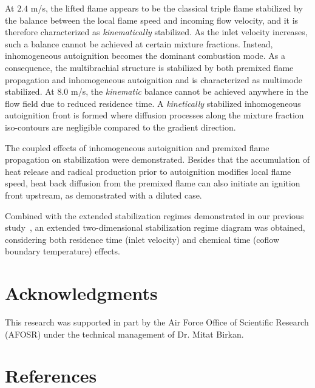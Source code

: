 \documentclass[review,3p,times]{elsarticle}
\begin{document}
At $2.4$ m/s, the lifted flame appears to be the classical triple flame stabilized by the balance between the local flame speed and incoming flow velocity, and it is therefore characterized as \emph {kinematically} stabilized.  As the inlet velocity increases, such a balance cannot be achieved at certain mixture fractions.  Instead, inhomogeneous autoignition becomes the dominant combustion mode.  As a consequence, the multibrachial structure is stabilized by both premixed flame propagation and inhomogeneous autoignition and is characterized as multimode stabilized.  At $8.0$ m/s, the \emph{kinematic} balance cannot be achieved anywhere in the flow field due to reduced residence time.  A \emph {kinetically} stabilized inhomogeneous autoignition front is formed where diffusion processes along the mixture fraction iso-contours are negligible compared to the gradient direction.

\textcolor{dl}{The coupled effects of inhomogeneous autoignition and premixed flame propagation on stabilization were demonstrated.  Besides that the accumulation of heat release and radical production prior to autoignition modifies local flame speed, heat back diffusion from the premixed flame can also initiate an ignition front upstream, as demonstrated with a diluted case.}

Combined with the extended stabilization regimes demonstrated in our previous study~\cite{deng15}, an extended two-dimensional stabilization regime diagram was obtained, considering both residence time (inlet velocity) and chemical time (coflow boundary temperature) effects.  



\section*{Acknowledgments}
This research was supported in part by the Air Force Office of Scientific Research (AFOSR) under the technical management of Dr. Mitat Birkan.


\section*{References}



\renewcommand{\thefigure}{\arabic{figure}}
\renewcommand{\thetable}{\arabic{table}}
\end{document}
